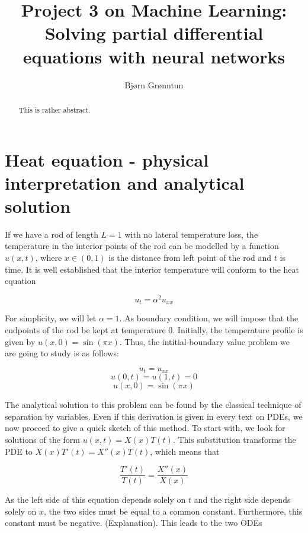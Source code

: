 \documentclass{article}
\title{Project 3 on Machine Learning: Solving partial differential equations with neural networks}
\author{Bj{\o}rn Gr{\o}nntun}
\begin{document}
\maketitle

\begin{abstract}
    This is rather abstract.
\end{abstract}

\section{Heat equation - physical interpretation and analytical solution}
If we have a rod of length $L=1$ with no lateral temperature loss, the temperature in the interior points of the rod can be modelled by a function $u(x, t)$, where $x\in (0, 1)$ is the distance from left point of the rod and $t$ is time. It is well established that the interior temperature will conform to the heat equation

\begin{equation}
    u_t = \alpha^2 u_{xx}
\end{equation}

For simplicity, we will let $\alpha=1$. As boundary condition, we will impose that the endpoints of the rod be kept at temperature 0. Initially, the temperature profile is given by $u(x, 0) = \sin(\pi x)$. Thus, the intitial-boundary value problem we are going to study is as follows:

\begin{equation}
    u_t = u_{xx}
\end{equation}
\begin{equation}
    u(0, t) = u(1, t) = 0
\end{equation}
\begin{equation}
    u(x, 0) = \sin(\pi x)
\end{equation}

The analytical solution to this problem can be found by the classical technique of separation by variables. Even if this derivation is given in every text on PDEs, we now proceed to give a quick sketch of this method. To start with, we look for solutions of the form $u(x, t) = X(x) T(t)$. This substitution transforms the PDE to $X(x) T'(t) = X''(x) T(t)$, which means that

\begin{equation}
    \frac{T'(t)}{T(t)} = \frac{X''(x)}{X(x)}
\end{equation}

As the left side of this equation depends solely on $t$ and the right side depends solely on $x$, the two sides must be equal to a common constant. Furthermore, this constant must be negative. (Explanation). This leads to the two ODEs
\end{document}
